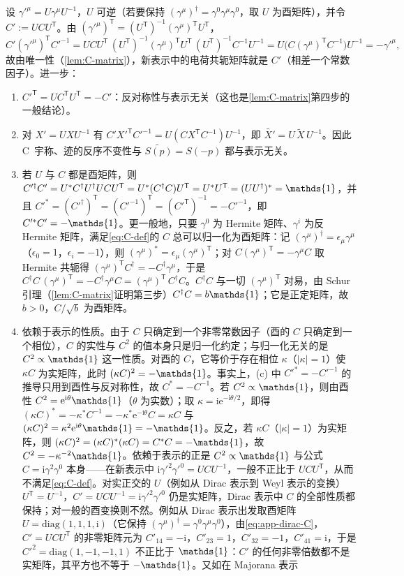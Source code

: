 \documentclass[UTF8,a4paper,11pt,fontset=fandol]{ctexart}
\let\amsmathbb\mathbb
\renewcommand{\mathbb}[1]{\ifx1#1\mathds{1}\else\amsmathbb{#1}\fi}
\theoremstyle{cplain}
\theoremstyle{cdefinition}
\theoremstyle{cremark}
\numberwithin{equation}{section}
\newcommand{\tp}{\mathsf{T}}                         %
\newcommand{\ii}{\mathrm{i}}                        %
\newcommand{\ee}{\mathrm{e}}                        %
\newcommand{\Cconj}[1]{\widetilde{#1}}              %
\begin{document}
设 $\gamma'^\mu=U\gamma^\mu U^{-1}$，$U$ 可逆（若要保持 $(\gamma^\mu)^\dagger=\gamma^0\gamma^\mu\gamma^0$，取 $U$ 为酉矩阵），并令 $C':=UCU^{\tp}$。由 $(\gamma'^\mu)^{\tp}=(U^{\tp})^{-1}(\gamma^\mu)^{\tp}U^{\tp}$，
\[
C'(\gamma'^\mu)^{\tp}C'^{-1}=UCU^{\tp}\,(U^{\tp})^{-1}(\gamma^\mu)^{\tp}U^{\tp}\,(U^{\tp})^{-1}C^{-1}U^{-1}=U\bigl(C(\gamma^\mu)^{\tp}C^{-1}\bigr)U^{-1}=-\gamma'^\mu ,
\]
故由唯一性（\cref{lem:C-matrix}），新表示中的电荷共轭矩阵就是 $C'$（相差一个常数因子）。进一步：
\begin{enumerate}[label=(\alph*)]
\item $C'^{\tp}=UC^{\tp}U^{\tp}=-C'$：反对称性与表示无关（这也是\cref{lem:C-matrix}第四步的一般结论）。
\item 对 $X'=UXU^{-1}$ 有 $C'X'^{\tp}C'^{-1}=U(CX^{\tp}C^{-1})U^{-1}$，即 $\Cconj{X'}=U\,\Cconj X\,U^{-1}$。因此 C~宇称、迹的反序不变性与 $\Cconj{S(p)}=S(-p)$ 都与表示无关。
\item 若 $U$ 与 $C$ 都是酉矩阵，则 $C'^\dagger C'=U^*C^\dagger U^\dagger UCU^{\tp}=U^*(C^\dagger C)U^{\tp}=U^*U^{\tp}=(UU^\dagger)^*=\mathbb 1$，并且 $C'^*=(C'^\dagger)^{\tp}=(C'^{-1})^{\tp}=(C'^{\tp})^{-1}=-C'^{-1}$，即 $C'^*C'=-\mathbb 1$。更一般地，只要 $\gamma^0$ 为 Hermite 矩阵、$\gamma^i$ 为反 Hermite 矩阵，满足\cref{eq:C-def}的 $C$ 总可以归一化为酉矩阵：记 $(\gamma^\mu)^\dagger=\epsilon_\mu\gamma^\mu$（$\epsilon_0=1$，$\epsilon_i=-1$），则 $(\gamma^\mu)^*=\epsilon_\mu(\gamma^\mu)^{\tp}$；对 $C(\gamma^\mu)^{\tp}=-\gamma^\mu C$ 取 Hermite 共轭得 $(\gamma^\mu)^{\tp}C^\dagger=-C^\dagger\gamma^\mu$，于是 $C^\dagger C\,(\gamma^\mu)^{\tp}=-C^\dagger\gamma^\mu C=(\gamma^\mu)^{\tp}\,C^\dagger C$。$C^\dagger C$ 与一切 $(\gamma^\mu)^{\tp}$ 对易，由 Schur 引理（\cref{lem:C-matrix}证明第三步）$C^\dagger C=b\mathbb 1$；它是正定矩阵，故 $b>0$，$C/\sqrt b$ 为酉矩阵。
\item 依赖于表示的性质。由于 $C$ 只确定到一个非零常数因子（酉的 $C$ 只确定到一个相位），$C$ 的实性与 $C^2$ 的值本身只是归一化约定；与归一化无关的是 $C^2\propto\mathbb 1$ 这一性质。对酉的 $C$，它等价于存在相位 $\kappa$（$|\kappa|=1$）使 $\kappa C$ 为实矩阵，此时 $(\kappa C)^2=-\mathbb 1$。事实上，(c) 中 $C'^*=-C'^{-1}$ 的推导只用到酉性与反对称性，故 $C^*=-C^{-1}$。若 $C^2\propto\mathbb 1$，则由酉性 $C^2=\ee^{\ii\theta}\mathbb 1$（$\theta$ 为实数）；取 $\kappa=\ii\ee^{-\ii\theta/2}$，即得 $(\kappa C)^*=-\kappa^*C^{-1}=-\kappa^*\ee^{-\ii\theta}C=\kappa C$ 与 $(\kappa C)^2=\kappa^2\ee^{\ii\theta}\mathbb 1=-\mathbb 1$。反之，若 $\kappa C$（$|\kappa|=1$）为实矩阵，则 $(\kappa C)^2=(\kappa C)^*(\kappa C)=C^*C=-\mathbb 1$，故 $C^2=-\kappa^{-2}\mathbb 1$。依赖于表示的正是 $C^2\propto\mathbb 1$ 与公式 $C=\ii\gamma^2\gamma^0$ 本身——在新表示中 $\ii\gamma'^2\gamma'^0=UCU^{-1}$，一般不正比于 $UCU^{\tp}$，从而不满足\cref{eq:C-def}。对实正交的 $U$（例如从 Dirac 表示到 Weyl 表示的变换）$U^{\tp}=U^{-1}$，$C'=UCU^{-1}=\ii\gamma'^2\gamma'^0$ 仍是实矩阵，Dirac 表示中 $C$ 的全部性质都保持；对一般的酉变换则不然。例如从 Dirac 表示出发取酉矩阵 $U=\mathrm{diag}(1,1,1,\ii)$（它保持 $(\gamma^\mu)^\dagger=\gamma^0\gamma^\mu\gamma^0$），由\cref{eq:app-dirac-C}，$C'=UCU^{\tp}$ 的非零矩阵元为 $C'_{14}=-\ii$，$C'_{23}=1$，$C'_{32}=-1$，$C'_{41}=\ii$，于是 $C'^2=\mathrm{diag}(1,-1,-1,1)$ 不正比于 $\mathbb 1$：$C'$ 的任何非零倍数都不是实矩阵，其平方也不等于 $-\mathbb 1$。又如在 Majorana 表示

\end{enumerate}
\end{document}
